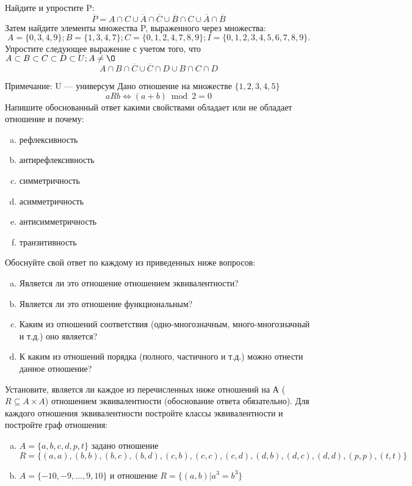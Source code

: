 \documentclass[10pt]{exam}
\begin{document}
\begin{questions}
\question
Найдите и упростите P:
\begin{equation*}
\overline{P} = A \cap C \cup \overline{A} \cap \overline{C} \cup \overline{B} \cap C \cup \overline{A} \cap \overline{B}
\end{equation*}
Затем найдите элементы множества P, выраженного через множества:
\begin{equation*}
A = \{0, 3, 4, 9\}; 
B = \{1, 3, 4, 7\};
C = \{0, 1, 2, 4, 7, 8, 9\};
I = \{0, 1, 2, 3, 4, 5, 6, 7, 8, 9\}.
\end{equation*}\question
Упростите следующее выражение с учетом того, что $A\subset B \subset C \subset D \subset U; A \neq \O$
\begin{equation*}
A \cap B  \cap \overline{C} \cup \overline{C} \cap D \cup B \cap C \cap D
\end{equation*}

Примечание: U — универсум\question
Дано отношение на множестве $\{1, 2, 3, 4, 5\}$ 
\begin{equation*}
aRb \iff (a+b) \bmod 2 =0
\end{equation*}
Напишите обоснованный ответ какими свойствами обладает или не обладает отношение и почему:   
\begin{enumerate} [a)]\setcounter{enumi}{0}
\item рефлексивность
\item антирефлексивность
\item симметричность
\item асимметричность
\item антисимметричность
\item транзитивность
\end{enumerate}

Обоснуйте свой ответ по каждому из приведенных ниже вопросов:
\begin{enumerate} [a)]\setcounter{enumi}{0}
    \item Является ли это отношение отношением эквивалентности?
    \item Является ли это отношение функциональным?
    \item Каким из отношений соответствия (одно-многозначным, много-многозначный и т.д.) оно является?
    \item К каким из отношений порядка (полного, частичного и т.д.) можно отнести данное отношение?
\end{enumerate}



\question
Установите, является ли каждое из перечисленных ниже отношений на А ($R \subseteq A \times A$) отношением эквивалентности (обоснование ответа обязательно). Для каждого отношения эквивалентности постройте классы 
эквивалентности и постройте граф отношения:
\begin{enumerate} [a)]\setcounter{enumi}{0}
\item $A = \{a, b, c, d, p, t\}$ задано отношение $R = \{(a, a), (b, b), (b, c), (b, d), (c, b), (c, c), (c, d), (d, b), (d, c), (d, d), (p,p), (t,t)\}$
\item $A = \{-10, -9, … , 9, 10\}$ и отношение $R = \{(a,b)|a^{3} = b^{3}\}$


\end{enumerate}
\end{questions}
\end{document}
